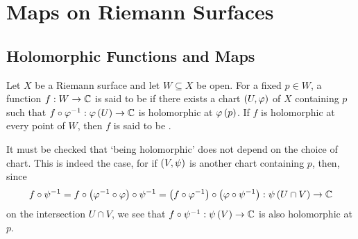 \documentclass[../Moduli_Spaces_of_Riemann_Surfaces.tex]{subfiles}
\begin{document}
    \section{Maps on Riemann Surfaces}
    \subsection{Holomorphic Functions and Maps}
    \begin{definition}
        Let $X$ be a Riemann surface and let $W\subseteq X$ be open. For a fixed $p\in W$, a function $f:W\to\mathbb{C}$ is said to be  if there exists a chart $\left(U,\varphi\right)$ of $X$ containing $p$ such that $f\circ\varphi^{-1}:\varphi\left(U\right)\to\mathbb{C}$ is holomorphic at $\varphi\left(p\right)$. If $f$ is holomorphic at every point of $W$, then $f$ is said to be .
    \end{definition}
    \begin{remark}
        It must be checked that $\textrm{`}$being holomorphic$\textrm{'}$ does not depend on the choice of chart. This is indeed the case, for if $\left(V,\psi\right)$ is another chart containing $p$, then, since
        \begin{equation}\label{1.2:eqn:holomorphic_function_well_defined}
            f\circ\psi^{-1}=f\circ\left(\varphi^{-1}\circ\varphi\right)\circ\psi^{-1}=\left(f\circ\varphi^{-1}\right)\circ\left(\varphi\circ\psi^{-1}\right):\psi\left(U\cap V\right)\to\mathbb{C}
        \end{equation}
        on the intersection $U\cap V$, we see that $f\circ\psi^{-1}:\psi\left(V\right)\to\mathbb{C}$ is also holomorphic at $p$.\exqed
    \end{remark}
\end{document}
